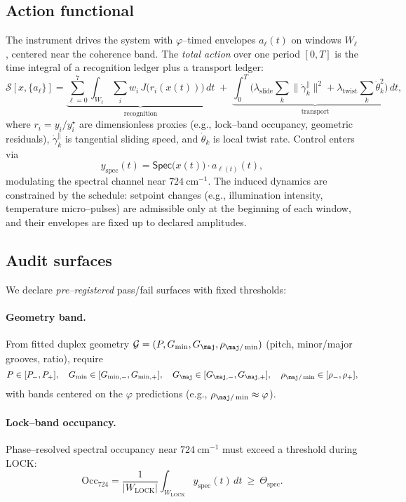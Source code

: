 \documentclass[11pt]{article}
\begin{document}
\subsection{Action functional}
The instrument drives the system with $\varphi$–timed envelopes $a_\ell(t)$ on windows $W_\ell$, centered near the coherence band. The \emph{total action} over one period $[0,T]$ is the time integral of a recognition ledger plus a transport ledger:
\[
\mathcal{S}[x,\{a_\ell\}]
=
\underbrace{\sum_{\ell=0}^{7}\int_{W_\ell}\!\sum_i w_i\,J\!\big(r_i(x(t))\big)\,dt}_{\text{recognition}}
\;+\;
\underbrace{\int_0^{T}\!\Big(\lambda_{\mathrm{slide}}\!\sum_k \|\dot{\gamma}_k^{\parallel}\|^2
+\lambda_{\mathrm{twist}}\!\sum_k \dot{\theta}_k^{2}\Big)\,dt}_{\text{transport}},
\]
where $r_i=y_i/y_i^\star$ are dimensionless proxies (e.g., lock–band occupancy, geometric residuals), $\dot{\gamma}_k^{\parallel}$ is tangential sliding speed, and $\dot{\theta}_k$ is local twist rate. Control enters via
\[
y_{\text{spec}}(t)=\mathsf{Spec}\big(x(t)\big)\cdot a_{\ell(t)}(t),
\]
modulating the spectral channel near $724~\mathrm{cm^{-1}}$. The induced dynamics are constrained by the schedule: setpoint changes (e.g., illumination intensity, temperature micro–pulses) are admissible only at the beginning of each window, and their envelopes are fixed up to declared amplitudes.

\subsection{Audit surfaces}
We declare \emph{pre–registered} pass/fail surfaces with fixed thresholds:

\paragraph{Geometry band.}
From fitted duplex geometry $\mathcal{G}=(P,G_{\min},G_{\maj},\rho_{\maj/\min})$ (pitch, minor/major grooves, ratio), require
\[
P\in[P_-,P_+],\quad G_{\min}\in[G_{\min,-},G_{\min,+}],\quad
G_{\maj}\in[G_{\maj,-},G_{\maj,+}],\quad
\rho_{\maj/\min}\in[\rho_-,\rho_+],
\]
with bands centered on the $\varphi$ predictions (e.g., $\rho_{\maj/\min}\approx \varphi$).

\paragraph{Lock–band occupancy.}
Phase–resolved spectral occupancy near $724~\mathrm{cm^{-1}}$ must exceed a threshold during \textsf{LOCK}:
\[
\mathrm{Occ}_{724}=\frac{1}{|W_{\mathrm{LOCK}}|}\int_{W_{\mathrm{LOCK}}}\!\!\!y_{\text{spec}}(t)\,dt\ \ge\ \Theta_{\mathrm{spec}}.
\]
\end{document}
